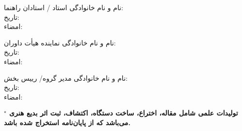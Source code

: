 \begin{landscape}
\begin{center}
\end{center}
\begin{minipage}{.4\textwidth}
\begin{center}\small
نام و نام خانوادگی استاد / استادان راهنما:\\
تاریخ:\\
امضاء:
\end{center}
\end{minipage}
\hspace{1cm}
	\begin{minipage}{.4\textwidth}
		\begin{center}\small
		نام و نام خانوادگی نماینده هیأت داوران:\\
			تاریخ:\\
			امضاء:
		\end{center}
	\end{minipage}
\begin{minipage}{.4\textwidth}
\begin{center}\small
نام و نام خانوادگی مدیر گروه/ رییس بخش:\\
تاریخ:\\
امضاء:
\end{center}
\end{minipage}
\begin{center}
\bfseries \fontsize{8}{9}\selectfont
$^\star$
تولیدات علمی شامل مقاله، اختراع، ساخت دستگاه، اکتشاف، ثبت اثر بدیع هنری می‌باشد که از پایان‌نامه استخراج شده باشد.

\end{center}
\end{landscape}
